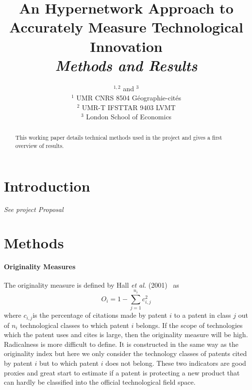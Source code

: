 


\title{
An Hypernetwork Approach to Accurately Measure Technological Innovation
\bigskip\\
\textit{Methods and Results}
}
\author{$^{1,2}$ and $^{3}$\medskip\\
$^{1}$ UMR CNRS 8504 G{\'e}ographie-cit{\'e}s\\
$^{2}$ UMR-T IFSTTAR 9403 LVMT\\
$^{3}$ London School of Economics
}
\date{}


\maketitle

\justify


\begin{abstract}
This working paper details technical methods used in the project and gives a first overview of results.
\end{abstract}

\section{Introduction}

\textit{See project Proposal}


\section{Methods}







\paragraph{Originality Measures}

The originality measure is
defined by Hall \textit{et al.} (2001)~\cite{Hall2001} as
\[
O_{i}=1-\sum_{j=1}^{n_{i}}{c_{i,j}^{2}}
\]
where $c_{i,j}$is the percentage of citations made by patent $i$ to a patent in class $j$ out of
$n_{i}$ technological classes to which patent $i$ belongs. If the scope of
technologies which the patent uses and cites is large, then the originality
measure will be high. Radicalness is more difficult to define. It is
constructed in the same way as the originality index but here we only consider
the technology classes of patents cited by patent $i$ but to which patent $i$
does not belong. These two indicators are good proxies and great start to estimate if a patent is protecting a new product that can hardly be classified into the official technological field space.



